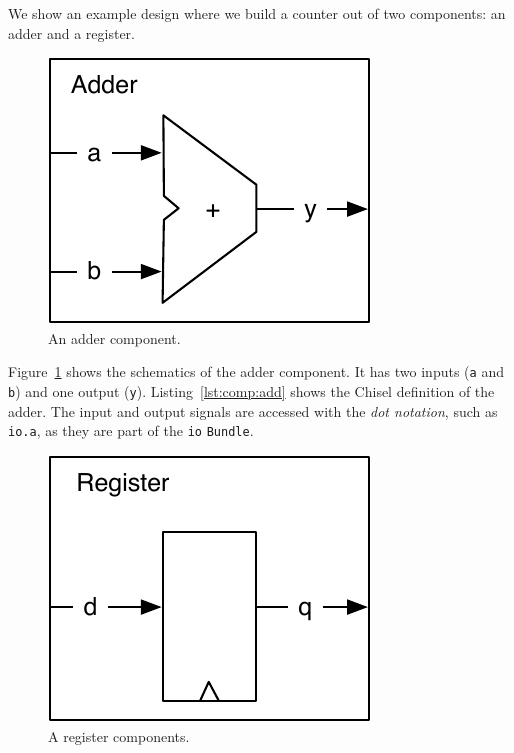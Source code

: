 \documentclass[%
    10pt,
    headinclude, footexclude,
    openright, %
    notitlepage,
    cleardoubleempty,
    headsepline,
    pointlessnumbers,
    bibtotoc, idxtotoc,
    ]{scrbook}
\newcommand{\code}[1]{{\small{\texttt{#1}}}}
\newcommand{\scale}{0.7}
\begin{document}
We show an example design where we build a counter out of two components:
an adder and a register.

\begin{figure}
  \centering
  \includegraphics[scale=\scale]{figures/components-adder}
  \caption{An adder component.}
  \label{fig:components-adder}
\end{figure}


Figure~\ref{fig:components-adder} shows the schematics of the adder component.
It has two inputs (\code{a} and \code{b}) and one output (\code{y}).
Listing~\ref{lst:comp:add} shows the Chisel definition of the adder.
The input and output signals are accessed with
the \emph{dot notation}, such as \code{io.a}, as they are part of the \code{io}
\code{Bundle}.

\begin{figure}
  \centering
  \includegraphics[scale=\scale]{figures/components-register}
  \caption{A register components.}
  \label{fig:components-register}
\end{figure}
\end{document}
